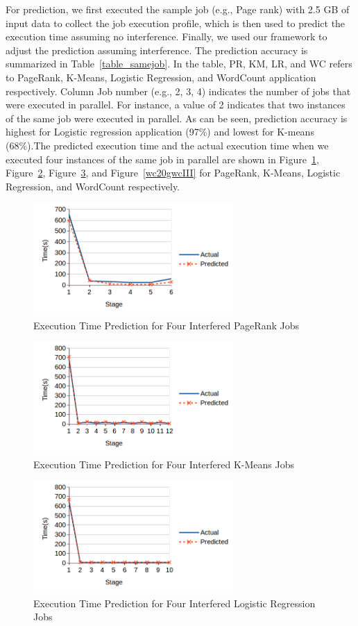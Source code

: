 For prediction, we first executed the sample job (e.g., Page rank) with 2.5 GB of input data to collect the job execution profile, which is then used to predict the execution time assuming no interference. Finally, we used our framework to adjust the prediction assuming interference. The prediction accuracy is summarized in Table~\ref{table_samejob}. In the table, PR, KM, LR, and WC refers to PageRank, K-Means, Logistic Regression, and WordCount application respectively. Column Job number (e.g., 2, 3, 4) indicates the number of jobs that were executed in parallel. For instance, a value of 2 indicates that two instances of the same job were executed in parallel. As can be seen, prediction accuracy is highest for Logistic regression application (97\%) and lowest for K-means (68\%).The predicted execution time and the actual execution time when we executed four instances of the same job in parallel are shown in Figure~\ref{pr20gprIII}, Figure~\ref{km20gkmIII}, Figure~\ref{lr20glrIII}, and Figure~\ref{wc20gwcIII} for PageRank, K-Means, Logistic Regression, and WordCount respectively. 
\begin{figure}[!t]
\centering
\captionsetup{justification=centering}
\includegraphics[width=3in]{figures/pr20g_prIII.png}
\caption{Execution Time Prediction for Four Interfered PageRank Jobs}
\label{pr20gprIII}
\end{figure}
\begin{figure}[!t]
\centering
\captionsetup{justification=centering}
\includegraphics[width=3in]{figures/km20g_kmIII.png}
\caption{Execution Time Prediction for Four Interfered K-Means Jobs}
\label{km20gkmIII}
\end{figure}
\begin{figure}[!t]
\centering
\captionsetup{justification=centering}
\includegraphics[width=3in]{figures/lr20g_lrIII.png}
\caption{Execution Time Prediction for Four Interfered Logistic Regression Jobs}
\label{lr20glrIII}
\end{figure}
